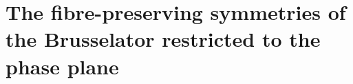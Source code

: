 \documentclass[12pt]{article}
\theoremstyle{definition}
\theoremstyle{remark}
\begin{document}
\section{The fibre-preserving symmetries of the Brusselator restricted to the phase plane}

\clearpage


\end{document}
